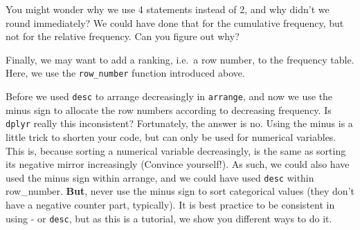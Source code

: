 \documentclass[]{tufte-book}
\newenvironment{Shaded}{}{}
\newcommand{\DataTypeTok}[1]{\textcolor[rgb]{0.56,0.13,0.00}{#1}}
\newcommand{\DecValTok}[1]{\textcolor[rgb]{0.25,0.63,0.44}{#1}}
\newcommand{\KeywordTok}[1]{\textcolor[rgb]{0.00,0.44,0.13}{\textbf{#1}}}
\newcommand{\NormalTok}[1]{#1}
\newcommand{\OperatorTok}[1]{\textcolor[rgb]{0.40,0.40,0.40}{#1}}
\newcommand{\StringTok}[1]{\textcolor[rgb]{0.25,0.44,0.63}{#1}}
\begin{document}
You might wonder why we use 4 statements instead of 2, and why didn't we round immediately? We could have done that for the cumulative frequency, but not for the relative frequency. Can you figure out why?

Finally, we may want to add a ranking, i.e.~a row number, to the frequency table. Here, we use the \texttt{row\_number} function introduced above.

Before we used \texttt{desc} to arrange decreasingly in \texttt{arrange}, and now we use the minus sign to allocate the row numbers according to decreasing frequency. Is \texttt{dplyr} really this inconsistent? Fortunately, the answer is no. Using the minus is a little trick to shorten your code, but can only be used for numerical variables. This is, because sorting a numerical variable decreasingly, is the same as sorting its negative mirror increasingly (Convince yourself!). As such, we could also have used the minus sign within arrange, and we could have used \texttt{desc} within row\_number. \textbf{But}, never use the minus sign to sort categorical values (they don't have a negative counter part, typically). It is best practice to be consistent in using - or \texttt{desc}, but as this is a tutorial, we show you different ways to do it.

\begin{Shaded}
\end{Shaded}
\end{document}
